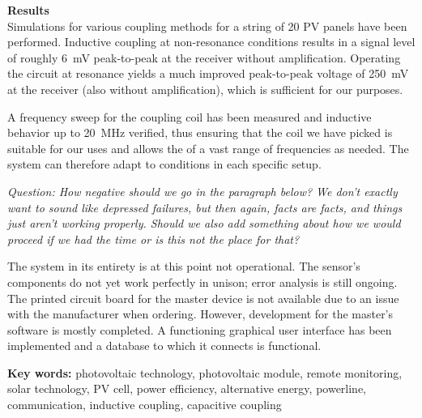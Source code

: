 \textbf{Results}\\
Simulations for  various coupling methods  for a string  of 20 PV  panels have
been performed. Inductive  coupling at  non-resonance conditions results  in a
signal  level  of roughly  \SI{6}{\milli\volt}  peak-to-peak  at the  receiver
without  amplification. Operating  the  circuit  at resonance  yields  a  much
improved peak-to-peak  voltage of \SI{250}{\milli\volt} at  the receiver (also
without amplification), which is sufficient for our purposes.

A  frequency sweep  for  the coupling  coil has  been  measured and  inductive
behavior up to  \SI{20}{\mega\hertz} verified, thus ensuring that  the coil we
have  picked is  suitable for  our uses  and  allows the  of a  vast range  of
frequencies as  needed. The system can  therefore adapt to conditions  in each
specific setup.

\vspace{1em}
\emph{Question: How negative  should we  go in  the paragraph  below? We don't
exactly  want to  sound like  depressed failures,  but then  again, facts  are
facts, and things  just aren't working properly. Should we  also add something
about how  we would proceed if  we had the time  or is this not  the place for
that?}

\vspace{1em}
The system  in its  entirety is  at this  point not  operational. The sensor's
components  do not  yet  work perfectly  in unison;  error  analysis is  still
ongoing. The printed circuit board for the  master device is not available due
to an issue with the  manufacturer when ordering. However, development for the
master's software is mostly completed.  A functioning graphical user interface
has been implemented and a database to which it connects is functional.

\vspace{2em}
\textbf{Key  words:}  photovoltaic  technology,  photovoltaic  module,  remote
monitoring, solar technology, PV cell, power efficiency, alternative energy,
powerline, communication, inductive coupling, capacitive coupling

